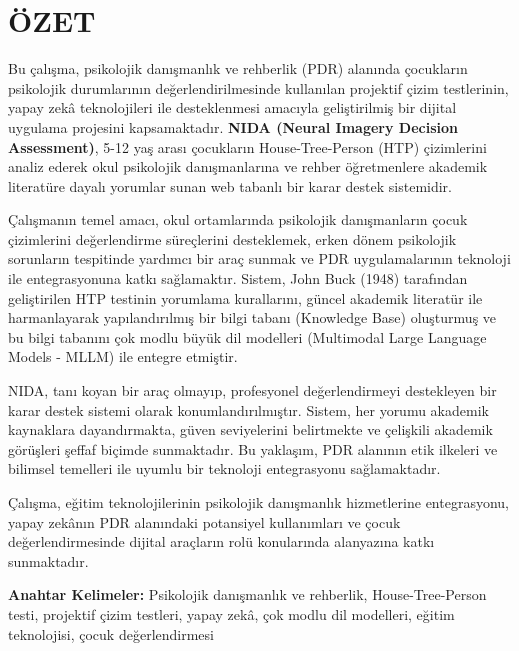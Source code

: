 
\chapter*{ÖZET}

Bu çalışma, psikolojik danışmanlık ve rehberlik (PDR) alanında çocukların psikolojik durumlarının değerlendirilmesinde kullanılan projektif çizim testlerinin, yapay zekâ teknolojileri ile desteklenmesi amacıyla geliştirilmiş bir dijital uygulama projesini kapsamaktadır. \textbf{NIDA (Neural Imagery Decision Assessment)}, 5-12 yaş arası çocukların House-Tree-Person (HTP) çizimlerini analiz ederek okul psikolojik danışmanlarına ve rehber öğretmenlere akademik literatüre dayalı yorumlar sunan web tabanlı bir karar destek sistemidir.

Çalışmanın temel amacı, okul ortamlarında psikolojik danışmanların çocuk çizimlerini değerlendirme süreçlerini desteklemek, erken dönem psikolojik sorunların tespitinde yardımcı bir araç sunmak ve PDR uygulamalarının teknoloji ile entegrasyonuna katkı sağlamaktır. Sistem, John Buck (1948) tarafından geliştirilen HTP testinin yorumlama kurallarını, güncel akademik literatür ile harmanlayarak yapılandırılmış bir bilgi tabanı (Knowledge Base) oluşturmuş ve bu bilgi tabanını çok modlu büyük dil modelleri (Multimodal Large Language Models - MLLM) ile entegre etmiştir.

NIDA, tanı koyan bir araç olmayıp, profesyonel değerlendirmeyi destekleyen bir karar destek sistemi olarak konumlandırılmıştır. Sistem, her yorumu akademik kaynaklara dayandırmakta, güven seviyelerini belirtmekte ve çelişkili akademik görüşleri şeffaf biçimde sunmaktadır. Bu yaklaşım, PDR alanının etik ilkeleri ve bilimsel temelleri ile uyumlu bir teknoloji entegrasyonu sağlamaktadır.

Çalışma, eğitim teknolojilerinin psikolojik danışmanlık hizmetlerine entegrasyonu, yapay zekânın PDR alanındaki potansiyel kullanımları ve çocuk değerlendirmesinde dijital araçların rolü konularında alanyazına katkı sunmaktadır.

\vspace{1cm}

\textbf{Anahtar Kelimeler:} Psikolojik danışmanlık ve rehberlik, House-Tree-Person testi, projektif çizim testleri, yapay zekâ, çok modlu dil modelleri, eğitim teknolojisi, çocuk değerlendirmesi

\newpage

